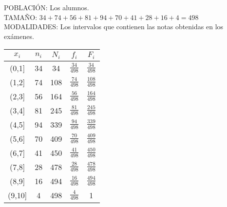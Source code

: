     \\
    \\
    POBLACIÓN: Los alumnos. \\
    TAMAÑO: $34+74+56+81+94+70+41+28+16+4=498$ \\
    MODALIDADES: Los intervalos que contienen las notas obtenidas en los exámenes. \\
    
    \begin{center}
    \begin{tabular}{| c | c | c | c | c |}
        \hline
        $x_i$ & $n_i$ & $N_i$ & $f_i$ & $F_i$ \\ \hline
        (0,1] & 34 & 34 & $\frac{34}{498}$ & $\frac{34}{498}$ \\
        (1,2] & 74 & 108 & $\frac{74}{498}$ & $\frac{108}{498}$ \\
        (2,3] & 56 & 164 & $\frac{56}{498}$ & $\frac{164}{498}$ \\
        (3,4] & 81 & 245 & $\frac{81}{498}$ & $\frac{245}{498}$ \\
        (4,5] & 94 & 339 & $\frac{94}{498}$ & $\frac{339}{498}$ \\
        (5,6] & 70 & 409 & $\frac{70}{498}$ & $\frac{409}{498}$\\
        (6,7] & 41 & 450 & $\frac{41}{498}$ & $\frac{450}{498}$\\
        (7,8] & 28 & 478 & $\frac{28}{498}$ & $\frac{478}{498}$\\
        (8,9] & 16 & 494 & $\frac{16}{498}$ & $\frac{494}{498}$\\
        (9,10] & 4 & 498 & $\frac{4}{498}$ & 1 \\ \hline
    \end{tabular}
    \end{center}
    
